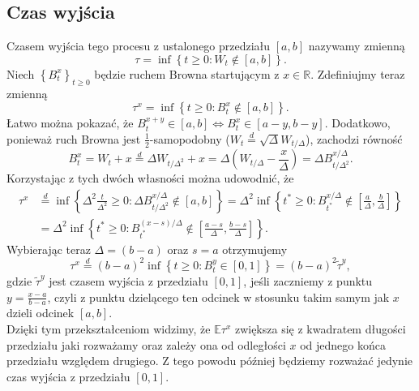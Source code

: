 \documentclass[12pt]{mwart}
\begin{document}
	\subsection{Czas wyjścia}
	\noindent Czasem wyjścia tego procesu z ustalonego przedziału $[a, b]$ nazywamy zmienną
	\begin{equation*}
		\tau=\inf\left\{t\geqslant0:W_t\notin[a, b]\right\}.
	\end{equation*}
	Niech $\left\{B^x_t\right\}_{t\geqslant0}$ będzie ruchem Browna startującym z $x\in\mathbb{R}$. Zdefiniujmy teraz zmienną 
	\begin{equation*}
		\tau^x=\inf\left\{t\geqslant0:B^x_t\notin[a, b]\right\}.
	\end{equation*}
	 Łatwo można pokazać, że $B^{x+y}_t\in[a ,b] \iff B^x_t\in[a-y, b-y]$.
	Dodatkowo, ponieważ ruch Browna jest $\frac{1}{2}$-samopodobny ($W_t\overset{d}{=}\sqrt{\Delta}W_{t/\Delta}$), zachodzi równość
	\begin{equation*}
		B^x_t=W_t+x\overset{d}{=}\Delta W_{t/\Delta^2}+x = \Delta\left(W_{t/\Delta}-\frac{x}{\Delta}\right)=\Delta B^{x/\Delta}_{t/\Delta^2}.
	\end{equation*}
	Korzystając z tych dwóch własności można udowodnić, że
	\begin{equation*}
		\begin{split}
			\tau^x&\overset{d}{=}\inf\left\{\Delta^2\frac{t}{\Delta^2}\geqslant0:\Delta B^{x/\Delta}_{t/\Delta^2}\notin[a, b]\right\} =\Delta^2\inf\left\{t^*\geqslant0:B^{x/\Delta}_{t^*}\notin\left[\frac{a}{\Delta},\frac{b}{\Delta}\right]\right\}\\
			&=\Delta^2\inf\left\{t^*\geqslant0:B^{(x-s)/\Delta}_{t^*}\notin\left[\frac{a-s}{\Delta},\frac{b-s}{\Delta}\right]\right\}.
		\end{split}
	\end{equation*}
	Wybierając teraz $\Delta=(b-a)$ oraz $s=a$ otrzymujemy
	\begin{equation}\label{eq:tau_przeskalowane}
		\tau^x\overset{d}{=}(b-a)^2\inf\left\{t\geqslant0:B^y_t\in[0,1]\right\}=(b-a)^2\widetilde\tau^y,
	\end{equation}
	gdzie $\widetilde\tau^y$ jest czasem wyjścia z przedziału $[0, 1]$, jeśli zaczniemy z punktu $y=\frac{x-a}{b-a}$, czyli z punktu dzielącego ten odcinek w stosunku takim samym jak $x$ dzieli odcinek $[a, b]$.\vspace{1.5mm}\\
	\noindent Dzięki tym przekształceniom widzimy, że $\mathbb{E}\tau^x$ zwiększa się z kwadratem długości przedziału jaki rozważamy oraz zależy ona od odległości $x$ od jednego końca przedziału względem drugiego. Z tego powodu później będziemy rozważać jedynie czas wyjścia z przedziału $[0, 1]$.
	
\end{document}
